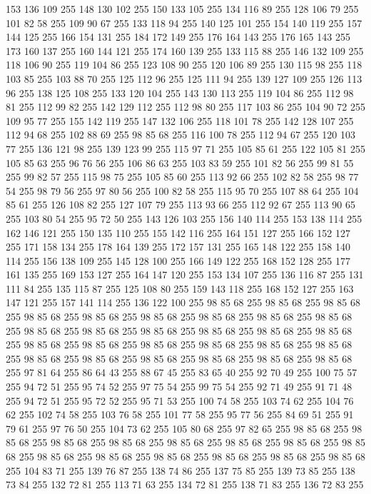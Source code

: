 153 136 109 255 148 130 102 255 150 133 105 255 134 116 89 255 128 106 79 255 101 82 58 255 109 90 67 255 133 118 94 255 140 125 101 255 154 140 119 255 157 144 125 255 166 154 131 255 184 172 149 255 176 164 143 255 176 165 143 255 173 160 137 255 160 144 121 255 174 160 139 255 133 115 88 255 146 132 109 255 118 106 90 255 119 104 86 255 123 108 90 255 120 106 89 255 130 115 98 255 118 103 85 255 103 88 70 255 125 112 96 255 125 111 94 255 139 127 109 255 126 113 96 255 138 125 108 255 133 120 104 255 143 130 113 255 119 104 86 255 112 98 81 255 112 99 82 255 142 129 112 255 112 98 80 255 117 103 86 255 104 90 72 255 109 95 77 255 155 142 119 255 147 132 106 255 118 101 78 255 142 128 107 255 112 94 68 255 102 88 69 255 98 85 68 255 116 100 78 255 112 94 67 255 120 103 77 255 136 121 98 255 139 123 99 255 115 97 71 255 105 85 61 255 122 105 81 255 105 85 63 255 96 76 56 255 106 86 63 255 103 83 59 255 101 82 56 255 99 81 55 255 99 82 57 255
115 98 75 255 105 85 60 255 113 92 66 255 102 82 58 255 98 77 54 255 98 79 56 255 97 80 56 255 100 82 58 255 115 95 70 255 107 88 64 255 104 85 61 255 126 108 82 255 127 107 79 255 113 93 66 255 112 92 67 255 113 90 65 255 103 80 54 255 95 72 50 255 143 126 103 255 156 140 114 255 153 138 114 255 162 146 121 255 150 135 110 255 155 142 116 255 164 151 127 255 166 152 127 255 171 158 134 255 178 164 139 255 172 157 131 255 165 148 122 255 158 140 114 255 156 138 109 255 145 128 100 255 166 149 122 255 168 152 128 255 177 161 135 255 169 153 127 255 164 147 120 255 153 134 107 255 136 116 87 255 131 111 84 255 135 115 87 255 125 108 80 255 159 143 118 255 168 152 127 255 163 147 121 255 157 141 114 255 136 122 100 255 98 85 68 255 98 85 68 255 98 85 68 255 98 85 68 255 98 85 68 255 98 85 68 255 98 85 68 255 98 85 68 255 98 85 68 255 98 85 68 255 98 85 68 255 98 85 68 255 98 85 68 255 98 85 68 255 98 85 68 255 98 85 68 255
98 85 68 255 98 85 68 255 98 85 68 255 98 85 68 255 98 85 68 255 98 85 68 255 98 85 68 255 98 85 68 255 98 85 68 255 98 85 68 255 98 85 68 255 97 81 64 255 86 64 43 255 88 67 45 255 83 65 40 255 92 70 49 255 100 75 57 255 94 72 51 255 95 74 52 255 97 75 54 255 99 75 54 255 92 71 49 255 91 71 48 255 94 72 51 255 95 72 52 255 95 71 53 255 100 74 58 255 103 74 62 255 104 76 62 255 102 74 58 255 103 76 58 255 101 77 58 255 95 77 56 255 84 69 51 255 91 79 61 255 97 76 50 255 104 73 62 255 105 80 68 255 97 82 65 255 98 85 68 255 98 85 68 255 98 85 68 255 98 85 68 255 98 85 68 255 98 85 68 255 98 85 68 255 98 85 68 255 98 85 68 255 98 85 68 255 98 85 68 255 98 85 68 255 98 85 68 255 98 85 68 255 104 83 71 255 139 76 87 255 138 74 86 255 137 75 85 255 139 73 85 255 138 73 84 255 132 72 81 255 113 71 63 255 134 72 81 255 138 71 83 255 136 72 83 255
